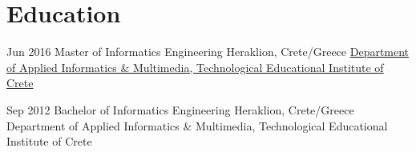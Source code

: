\vspace{-0.04cm}
\section{\normalfont Education}
\vspace{-0.1cm}
\begin{entrylist}
\entry
{Jun 2016}
{Master {\normalfont of Informatics Engineering}}
{Heraklion, Crete/Greece}
{\href{https://www.teicrete.gr/}{Department of Applied Informatics \& Multimedia, Technological Educational Institute of Crete}}
\\
\vspace{-.4cm}

\entry
{Sep 2012}
{Bachelor {\normalfont of Informatics Engineering}}
{Heraklion, Crete/Greece}
Department of Applied Informatics \& Multimedia, Technological Educational Institute of Crete
\end{entrylist}

\vspace{-.04cm}
